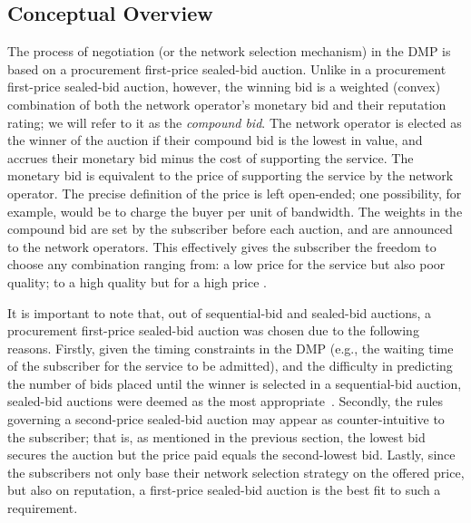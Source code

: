 \subsection{Conceptual Overview} %
\label{sub:conceptual_overview_dmp}
The process of negotiation (or the network selection mechanism) in the DMP is based on a procurement first-price sealed-bid auction. Unlike in a procurement first-price sealed-bid auction, however, the winning bid is a weighted (convex) combination of both the network operator's monetary bid and their reputation rating; we will refer to it as the \emph{compound bid}. The network operator is elected as the winner of the auction if their compound bid is the lowest in value, and accrues their monetary bid minus the cost of supporting the service. The monetary bid is equivalent to the price of supporting the service by the network operator. The precise definition of the price is left open-ended; one possibility, for example, would be to charge the buyer per unit of bandwidth. The weights in the compound bid are set by the subscriber before each auction, and are announced to the network operators. This effectively gives the subscriber the freedom to choose any combination ranging from: a low price for the service but also poor quality; to a high quality but for a high price \cite{DMLeBodic00}.

It is important to note that, out of sequential-bid and sealed-bid auctions, a procurement first-price sealed-bid auction was chosen due to the following reasons. Firstly, given the timing constraints in the DMP (e.g., the waiting time of the subscriber for the service to be admitted), and the difficulty in predicting the number of bids placed until the winner is selected in a sequential-bid auction, sealed-bid auctions were deemed as the most appropriate~\cite{DMLeBodic00}. Secondly, the rules governing a second-price sealed-bid auction may appear as counter-intuitive to the subscriber; that is, as mentioned in the previous section, the lowest bid secures the auction but the price paid equals the second-lowest bid. Lastly, since the subscribers not only base their network selection strategy on the offered price, but also on reputation, a first-price sealed-bid auction is the best fit to such a requirement.

